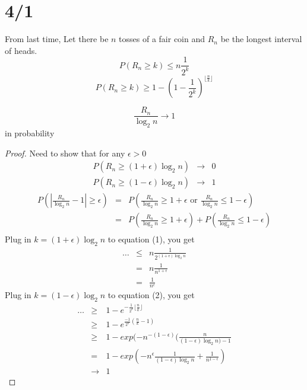 \section*{4/1}
  From last time,
  Let there be $n$ tosses of a fair coin and $R_n$ be the longest interval of 
  heads.\\
  $$
    P(R_n \ge k) \le n \frac{1}{2^k}
  $$
  $$
    P(R_n \ge k) \ge 1 - \left(1 - \frac{1}{2^k}\right)^{\lfloor \frac{n}{k}\rfloor}
  $$
  \begin{theorem}
    $$
      \frac{R_n}{\log_2n} \to 1
    $$
    in probability
  \end{theorem}
  \begin{proof}
    Need to show that for any $\epsilon > 0$
    \begin{eqnarray}
      P(R_n \ge (1 + \epsilon) \log_2n) & \to & 0\\
      P(R_n \ge (1 - \epsilon) \log_2n) & \to & 1 
    \end{eqnarray}
    \begin{eqnarray*}
      P\left(\left|\frac{R_n}{\log_2n} - 1\right| \ge \epsilon\right)
      & = & P\left(\frac{R_n}{\log_2n} \ge 1 + \epsilon \text { or } 
      \frac{R_n}{\log_2n} \le 1 - \epsilon\right)\\
      & = & P\left(\frac{R_n}{\log_2n} \ge 1 + \epsilon\right) + P\left(\frac{R_n}{
      \log_2n} \le 1 - \epsilon\right)\\
    \end{eqnarray*}
    Plug in $k = (1 + \epsilon)\log_2n$ to equation (1), you get
    \begin{eqnarray*}
      \ldots & \le & n \frac{1}{2^{(1 + \epsilon)\log_2n}}\\
      & = & n \frac{1}{n^{1 + \epsilon}}\\
      & = & \frac{1}{n^{\epsilon}}
    \end{eqnarray*}
    Plug in $k = (1 - \epsilon)\log_2n$ to equation (2), you get
    \begin{eqnarray*}
      \ldots & \ge & 1 - e^{-\frac{1}{2^k} \lfloor\frac{n}{k}\rfloor}\\
      & \ge & 1 - e^{\frac{-1}{2^k}(\frac{n}{k} - 1)}\\
      & \ge & 1 - exp(-n^{-(1 - \epsilon)}(\frac{n}{(1 - \epsilon)\log_2n) - 1}\\
      & = & 1 - exp\left(- n^{\epsilon}\frac{1}{(1 - \epsilon)\log_2n} + \frac{1}{n^{1 - \epsilon}}\right)\\
      & \to & 1
    \end{eqnarray*}
  \end{proof}
